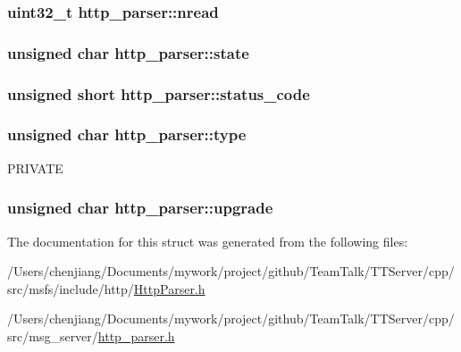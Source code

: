 \subsubsection[{nread}]{\setlength{\rightskip}{0pt plus 5cm}uint32\+\_\+t http\+\_\+parser\+::nread}\label{structhttp__parser_a78085ca896bb3b9aa1ecb0f6fddc039d}
\hypertarget{structhttp__parser_a1e39f73146ee7cb9774482180c693d6b}{}
\subsubsection[{state}]{\setlength{\rightskip}{0pt plus 5cm}unsigned char http\+\_\+parser\+::state}\label{structhttp__parser_a1e39f73146ee7cb9774482180c693d6b}
\hypertarget{structhttp__parser_a6aaeac3a79271169cd0902992820a9c5}{}
\subsubsection[{status\+\_\+code}]{\setlength{\rightskip}{0pt plus 5cm}unsigned short http\+\_\+parser\+::status\+\_\+code}\label{structhttp__parser_a6aaeac3a79271169cd0902992820a9c5}
\hypertarget{structhttp__parser_a20b4326f0a092ca2261b32ce22f0d296}{}
\subsubsection[{type}]{\setlength{\rightskip}{0pt plus 5cm}unsigned char http\+\_\+parser\+::type}\label{structhttp__parser_a20b4326f0a092ca2261b32ce22f0d296}
P\+R\+I\+V\+A\+T\+E \hypertarget{structhttp__parser_a4eeddd444d2c6a9bf1d0fbdf3280dd70}{}
\subsubsection[{upgrade}]{\setlength{\rightskip}{0pt plus 5cm}unsigned char http\+\_\+parser\+::upgrade}\label{structhttp__parser_a4eeddd444d2c6a9bf1d0fbdf3280dd70}


The documentation for this struct was generated from the following files\+:\begin{DoxyCompactItemize}
\item 
/\+Users/chenjiang/\+Documents/mywork/project/github/\+Team\+Talk/\+T\+T\+Server/cpp/src/msfs/include/http/\hyperlink{_http_parser_8h}{Http\+Parser.\+h}\item 
/\+Users/chenjiang/\+Documents/mywork/project/github/\+Team\+Talk/\+T\+T\+Server/cpp/src/msg\+\_\+server/\hyperlink{http__parser_8h}{http\+\_\+parser.\+h}\end{DoxyCompactItemize}
